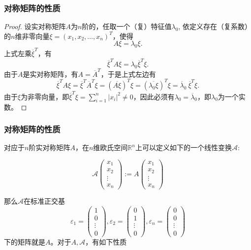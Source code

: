 
\begin{frame}
\frametitle{对称矩阵的性质}

\begin{proof}
设实对称矩阵$A$为$n$阶的，任取一个（复）特征值$\lambda_0$, 依定义存在（复系数）的$n$维非零向量$\xi = (x_1,x_2,\ldots,x_n)^T$，使得
$$A\xi = \lambda_0\xi.$$
上式左乘$\overline{\xi}^T$，有
$$\overline{\xi}^TA\xi = \lambda_0 \overline{\xi}^T\xi.$$
由于$A$是实对称矩阵，有$A = \overline{A}^T$，于是上式左边有
$$\overline{\xi}^TA\xi = \overline{\xi}^T\overline{A}^T\xi = (\overline{A\xi})^T\xi = (\overline{\lambda_0\xi})^T\xi = \overline{\lambda}_0 ~ \overline{\xi}^T\xi.$$
由于$\xi$为非零向量，即$\displaystyle \overline{\xi}^T\xi = \sum\limits_{i=1}^n \lvert x_i \rvert^2 \neq 0$，因此必须有$\lambda_0 = \overline{\lambda}_0$，即$\lambda_0$为一个实数。
\end{proof}

\end{frame}


\begin{frame}
\frametitle{对称矩阵的性质}

对应于$n$阶实对称矩阵$A$，在$n$维欧氏空间$\mathbb{R}^n$上可以定义如下的一个线性变换$\mathscr{A}$:

$$\mathscr{A} \begin{pmatrix} x_1 \\ x_2 \\ \vdots \\ x_n \end{pmatrix} := A \begin{pmatrix} x_1 \\ x_2 \\ \vdots \\ x_n \end{pmatrix}$$

\pause

那么$\mathscr{A}$在标准正交基
$$\varepsilon_1 = \begin{pmatrix} 1 \\ 0 \\ \vdots \\ 0 \end{pmatrix}, \varepsilon_2 = \begin{pmatrix} 0 \\ 1 \\ \vdots \\ 0 \end{pmatrix}, \varepsilon_n = \begin{pmatrix} 0 \\ 0 \\ \vdots \\ 0 \end{pmatrix}$$
下的矩阵就是$A$。对于$A, \mathscr{A}$，有如下性质

\end{frame}


